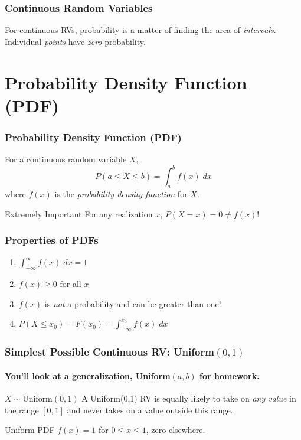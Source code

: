 
\begin{frame}
\frametitle{Continuous Random Variables}

For continuous RVs, probability is a matter of finding the area of \emph{intervals}. Individual \emph{points} have \emph{zero} probability.

\end{frame}



\section{Probability Density Function (PDF)}

\begin{frame}
\frametitle{Probability Density Function (PDF)}
For a continuous random variable $X$, 
	$$P(a \leq X \leq b) = \int_a^b f(x) \; dx$$
where $f(x)$ is the \emph{probability density function} for $X$. 
\vspace{2em}

\begin{alertblock}{Extremely Important}
For any realization $x$, $P(X=x) = 0 \neq f(x)$!
\end{alertblock}
\end{frame}
\begin{frame}
\frametitle{Properties of PDFs}
\begin{enumerate}
\item $\int_{-\infty}^\infty f(x) \; dx = 1$ 
\item $f(x) \geq 0$ for all $x$
\item $f(x)$ is \emph{not} a probability and can be greater than one!
\item $P(X\leq x_0) = F(x_0) = \int_{-\infty}^{x_0} f(x) \; dx $
\end{enumerate}
\end{frame}
\begin{frame}
\frametitle{Simplest Possible Continuous RV: Uniform$(0,1)$}
\framesubtitle{You'll look at a generalization, Uniform$(a,b)$ for homework.}

\begin{block}{$X \sim \mbox{Uniform}(0,1)$}
A Uniform(0,1) RV is equally likely to take on \emph{any value} in the range $[0,1]$ and never takes on a value outside this range.
\end{block}

\begin{block}{Uniform PDF}
$f(x) = 1$ for $0\leq x \leq 1$, zero elsewhere.
\end{block}

\end{frame}


